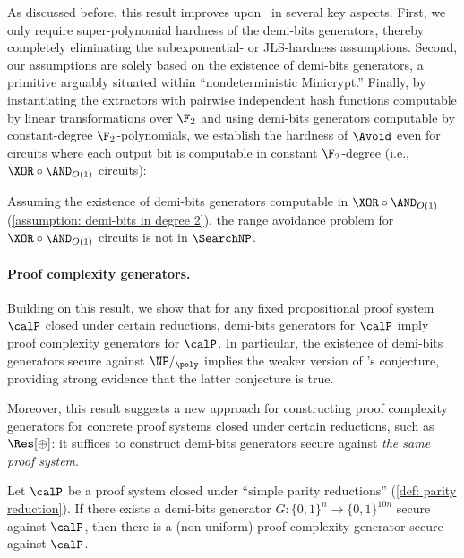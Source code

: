 As discussed before, this result improves upon~\cite{DBLP:conf/stoc/IlangoLW23, DBLP:conf/stoc/ChenL24} in several key aspects. First, we only require super-polynomial hardness of the demi-bits generators, thereby completely eliminating the subexponential- or JLS-hardness assumptions. Second, our assumptions are solely based on the existence of demi-bits generators, a primitive arguably situated within ``nondeterministic Minicrypt.'' 
Finally, by instantiating the extractors with pairwise independent hash functions computable by linear transformations over $\F_2$ and using demi-bits generators computable by constant-degree $\F_2$-polynomials, we establish the hardness of $\Avoid$ even for circuits where each output bit is computable in constant $\F_2$-degree (i.e., $\XOR\circ\AND_{O(1)}$ circuits):

\begin{corollary}[Informal]\label{cor: main degree-O(1) Avoid notin FP}
	Assuming the existence of demi-bits generators computable in $\XOR\circ\AND_{O(1)}$ (\autoref{assumption: demi-bits in degree 2}), the range avoidance problem for $\XOR\circ\AND_{O(1)}$ circuits is not in $\SearchNP$.
\end{corollary}



\paragraph{Proof complexity generators.} Building on this result, we show that for any fixed propositional proof system $\calP$ closed under certain reductions, demi-bits generators for $\calP$ imply proof complexity generators for $\calP$. In particular, the existence of demi-bits generators secure against $\NP/_\poly$ implies the weaker version of \Krajicek's conjecture, providing strong evidence that the latter conjecture is true. 

Moreover, this result suggests a new approach for constructing proof complexity generators for concrete proof systems closed under certain reductions, such as $\Res[\oplus]$: it suffices to construct demi-bits generators secure against \emph{the same proof system}.



\begin{theorem}\label{thm: main pcg}
    Let $\calP$ be a proof system closed under ``simple parity reductions'' (\autoref{def: parity reduction}). If there exists a demi-bits generator $G: \{0, 1\}^n \to \{0, 1\}^{10n}$ secure against $\calP$, then there is a (non-uniform) proof complexity generator secure against $\calP$.
\end{theorem}



